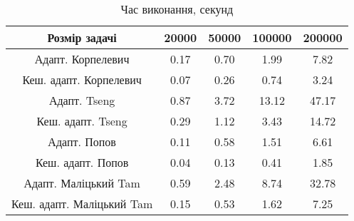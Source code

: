 \begin{table}[H]
	\centering
	\begin{tabular}{|c||c|c|c|c|}\hline
		Розмір задачі & 20000 & 50000 & 100000 & 200000 \\ \hline \hline
		Адапт. Корпелевич & 0.17 & 0.70 & 1.99 & 7.82 \\ \hline
		Кеш. адапт. Корпелевич & 0.07 & 0.26 & 0.74 & 3.24 \\ \hline
		Адапт. Tseng & 0.87 & 3.72 & 13.12 & 47.17 \\ \hline
		Кеш. адапт. Tseng & 0.29 & 1.12 & 3.43 & 14.72 \\ \hline
		Адапт. Попов & 0.11 & 0.58 & 1.51 & 6.61 \\ \hline
		Кеш. адапт. Попов & 0.04 & 0.13 & 0.41 & 1.85 \\ \hline
		Адапт. Маліцький Tam & 0.59 & 2.48 & 8.74 & 32.78 \\ \hline
		Кеш. адапт. Маліцький Tam & 0.15 & 0.53 & 1.62 & 7.25 \\ \hline
	\end{tabular}
	\caption{Час виконання, секунд}
\end{table}
